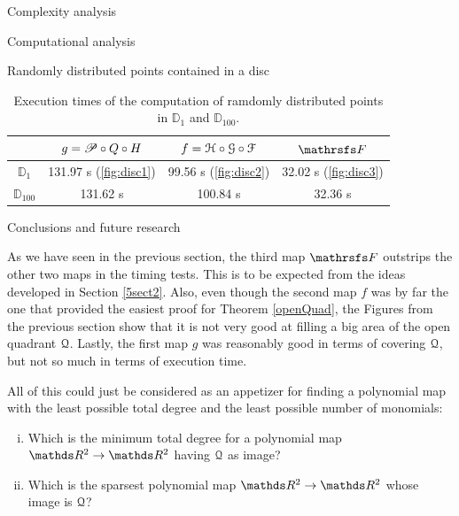 \documentclass[11pt, a4paper, english, twoside, notitlepage, openright]{report}
\begin{document}
\begin{chapter}{Complexity analysis}
\begin{section}{Computational analysis}
\begin{subsection}{Randomly distributed points contained in a disc}
\vspace{0.2cm}

\begin{table}[ht!]
\begin{center}
\begin{tabular}{c || c | c | c}
& $g = \P\circ Q \circ H$ & $f=\HH\circ\GG\circ\FF$ & $\FFF$ \\ \hline \hline
${\mathbb D}_1$ & 131.97 s (\ref{fig:disc1}) & 99.56 s (\ref{fig:disc2}) & 32.02 s (\ref{fig:disc3}) \\ \hline
${\mathbb D}_{100}$ & 131.62 s & 100.84 s & 32.36 s \\
\end{tabular}
\caption[Execution times of the computation of points contained in ${\mathbb D}_{1}$ and ${\mathbb D}_{100}$.]{Execution times of the computation of ramdomly distributed points in ${\mathbb D}_{1}$ and ${\mathbb D}_{100}$.}\label{tab:disc}
\end{center}
\end{table}

\end{subsection}

\end{section}

\begin{section}{Conclusions and future research}\label{5sect4}

As we have seen in the previous section, the third map $\FFF$ outstrips the other two maps in the timing tests. This is to be expected from the ideas developed in Section \ref{5sect2}. Also, even though the second map $f$ was by far the one that provided the easiest proof for Theorem \ref{openQuad}, the Figures from the previous section show that it is not very good at filling a big area of the open quadrant $\Qu$. Lastly, the first map $g$ was reasonably good in terms of covering $\Qu$, but not so much in terms of execution time.

All of this could just be considered as an appetizer for finding a polynomial map with the least possible total degree and the least possible number of monomials:
\begin{problem}
\begin{enumerate}[(i)]
\item Which is the minimum total degree for a polynomial map $\R^2 \to \R^2$ having $\Qu$ as image?
\item Which is the sparsest polynomial map $\R^2 \to \R^2$ whose image is $\Qu$?
\end{enumerate}
\end{problem}


\end{section}
\end{chapter}
\end{document}
